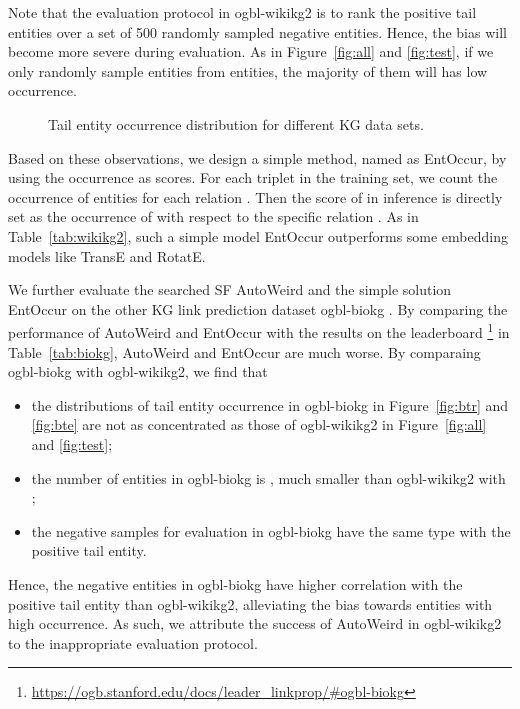\documentclass{article}
\begin{document}
Note that
the evaluation protocol in ogbl-wikikg2 is
to rank the positive tail entities
over a set of 500 randomly sampled negative entities.
Hence,
the bias will become more severe during evaluation.
As in Figure~\ref{fig:all} and \ref{fig:test},
if we only randomly sample  entities from  entities,
the majority of them will has low occurrence.

\begin{figure}[ht]
	\centering
	\quad
	\quad
	\caption{Tail entity occurrence distribution for different KG data sets.}
	\label{fig:dist}
\end{figure}

Based on these observations,
we design a simple method,
named as EntOccur,
by using the occurrence as scores.
For each triplet  in the training set, 
we count the occurrence of entities  for each relation .
Then the score of  in inference is directly 
set as the occurrence of  with respect to 
the specific relation .
As in Table~\ref{tab:wikikg2},
such a simple model EntOccur 
outperforms some embedding models 
like TransE and RotatE.

We further evaluate the searched SF AutoWeird 
and the simple solution EntOccur on the other KG link prediction dataset
ogbl-biokg \cite{hu2020ogb}.
By comparing the performance of AutoWeird and EntOccur with the results on the leaderboard
\footnote{\url{https://ogb.stanford.edu/docs/leader_linkprop/#ogbl-biokg}}
in Table~\ref{tab:biokg},
AutoWeird and EntOccur are much worse.
By comparaing ogbl-biokg with ogbl-wikikg2, we find that
\begin{itemize}
	\item the distributions of tail entity occurrence in ogbl-biokg in Figure~\ref{fig:btr} and \ref{fig:bte} are not as concentrated as those of ogbl-wikikg2 in Figure~\ref{fig:all} and \ref{fig:test};
	\item the number of entities in ogbl-biokg is , much smaller than ogbl-wikikg2 with ;
	\item the negative samples for evaluation in ogbl-biokg 
		have the same type with the positive tail entity.
\end{itemize}
Hence, the negative entities in ogbl-biokg have higher correlation with the positive tail entity
than ogbl-wikikg2,
alleviating the bias towards entities with high occurrence.
As such, we attribute the success of AutoWeird in ogbl-wikikg2 
to the inappropriate evaluation protocol.
\end{document}
